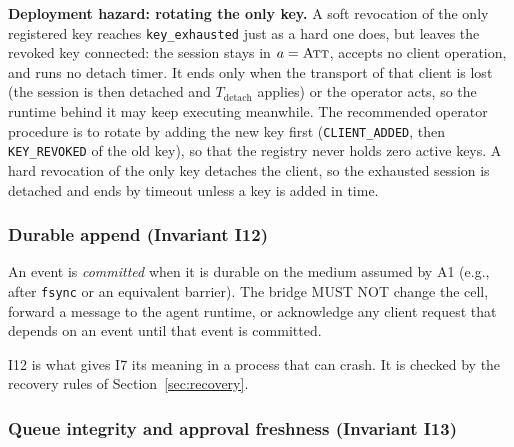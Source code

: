 \textbf{Deployment hazard: rotating the only key.} A soft revocation
of the only registered key reaches \texttt{key\_exhausted} just as a
hard one does, but leaves the revoked key connected: the session stays
in $a=\textsc{Att}$, accepts no client operation, and runs no detach
timer. It ends only when the transport of that client is lost (the
session is then detached and $T_{\text{detach}}$ applies) or the operator
acts, so the runtime behind it may keep executing meanwhile. The
recommended operator procedure is to rotate by adding the new key first
(\texttt{CLIENT\_ADDED}, then \texttt{KEY\_REVOKED} of the old key), so
that the registry never holds zero active keys. A hard revocation of
the only key detaches the client, so the exhausted session is detached
and ends by timeout unless a key is added in time.

\subsubsection{Durable append (Invariant I12)}
\label{sec:invariants-durable}

\begin{invariant}\label{inv:I12}
An event is \emph{committed} when it is durable on the medium assumed
by A1 (e.g., after \texttt{fsync} or an equivalent barrier). The bridge
MUST NOT change the cell, forward a message to the agent runtime, or
acknowledge any client request that depends on an event until that event
is committed.
\end{invariant}

I12 is what gives I7 its meaning in a process that can crash. It is
checked by the recovery rules of Section~\ref{sec:recovery}.

\subsubsection{Queue integrity and approval freshness (Invariant I13)}
\label{sec:invariants-queue}

